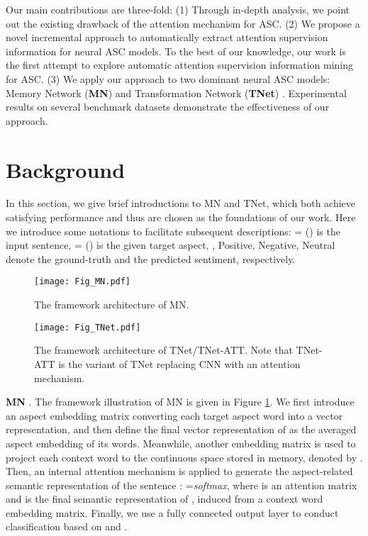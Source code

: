 \documentclass[11pt,a4paper]{article}
\begin{document}
Our main contributions are three-fold:
(1) Through in-depth analysis,
we point out the existing drawback of the attention mechanism for ASC.
(2)
We propose a novel incremental approach to automatically extract attention supervision information for neural ASC models.
To the best of our knowledge,
our work is the first attempt to explore automatic attention supervision information mining for ASC.
(3) We apply our approach to two dominant neural ASC models:
Memory Network (\textbf{MN}) \cite{Tang:EMNLP2016,Wang:ACL2018} and Transformation Network (\textbf{TNet}) \cite{Li:ACL2018}.
Experimental results on several benchmark datasets
demonstrate the effectiveness of our approach.





\section{Background}\label{Section_Background}
In this section,
we give brief introductions to MN and TNet,
which both achieve satisfying performance and thus are chosen as the foundations of our work.
Here we
introduce some notations to facilitate subsequent descriptions:
= () is the input sentence,
= () is the given target aspect,
, Positive, Negative, Neutral
denote the ground-truth and the predicted sentiment, respectively.

\begin{figure}[!t]
	\centering
	\texttt{[image: Fig\_MN.pdf]}
	\caption{\label{Fig_MN}
		The framework architecture of MN.
	}
\end{figure}

\begin{figure}[!t]
	\centering
	\texttt{[image: Fig\_TNet.pdf]}
	\caption{\label{Fig_TNet}
		The framework architecture of \textcolor[rgb]{1,0,0}{TNet}/\textcolor[rgb]{0,0,1}{TNet-ATT}.
Note that TNet-ATT is the variant of TNet replacing CNN with an attention mechanism.
	}
\end{figure}

\textbf{MN} \cite{Tang:EMNLP2016,Wang:ACL2018}.
The framework illustration of MN is given in Figure \ref{Fig_MN}.
We first introduce an aspect embedding matrix converting each target aspect word  into a vector representation,
and then define the final vector representation  of  as the averaged aspect embedding of its words.
Meanwhile,
another embedding matrix is used to project each context word  to the continuous space stored in memory,
denoted by .
Then,
an internal attention mechanism is applied to generate the aspect-related semantic representation  of the sentence :
 =\emph{softmax},
where  is an attention matrix and  is the final semantic representation of ,
induced from a context word embedding matrix.
Finally,
we use a fully connected output layer to conduct classification based on  and .
\end{document}
